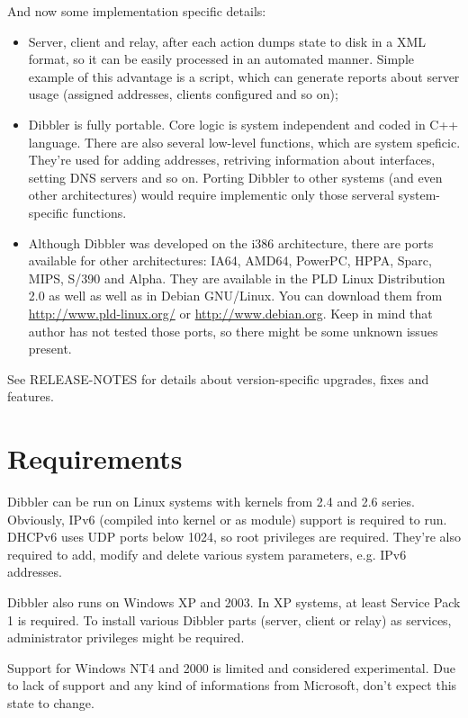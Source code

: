 And now some implementation specific details:
\begin{itemize}
\item Server, client and relay, after each action dumps state to disk
  in a XML format, so it can be easily processed in an automated
  manner. Simple example of this advantage is a script, which can generate
  reports about server usage (assigned addresses, clients configured
  and so on);
\item Dibbler is fully portable. Core logic is system independent and
  coded in C++ language. There are also several low-level functions,
  which are system speficic. They're used for adding addresses,
  retriving information about interfaces, setting DNS servers and so
  on. Porting Dibbler to other systems (and even other architectures)
  would require implementic only those serveral system-specific
  functions.
\item Although Dibbler was developed on the i386 architecture, there
  are ports available for other architectures: IA64, AMD64, PowerPC,
  HPPA, Sparc, MIPS, S/390 and Alpha. They are available in the PLD
  Linux Distribution 2.0 as well as well as in Debian GNU/Linux. You
  can download them from \url{http://www.pld-linux.org/} or
  \url{http://www.debian.org}. Keep in mind
  that author has not tested those ports, so there might be some
  unknown issues present.
\end{itemize}

See RELEASE-NOTES for details about version-specific upgrades, fixes
and features.

\section{Requirements}
Dibbler can be run on Linux systems with kernels from 2.4 and 2.6
series. Obviously, IPv6 (compiled into kernel or as module) support is
required to run. DHCPv6 uses UDP ports below 1024, so root privileges
are required. They're also required to add, modify and delete various
system parameters, e.g. IPv6 addresses.

Dibbler also runs on Windows XP and 2003. In XP systems, at least
Service Pack 1 is required. To install various Dibbler parts (server,
client or relay) as services, administrator privileges might be
required. 

Support for Windows NT4 and 2000 is limited and considered
experimental. Due to lack of support and any kind of informations from
Microsoft, don't expect this state to change.
